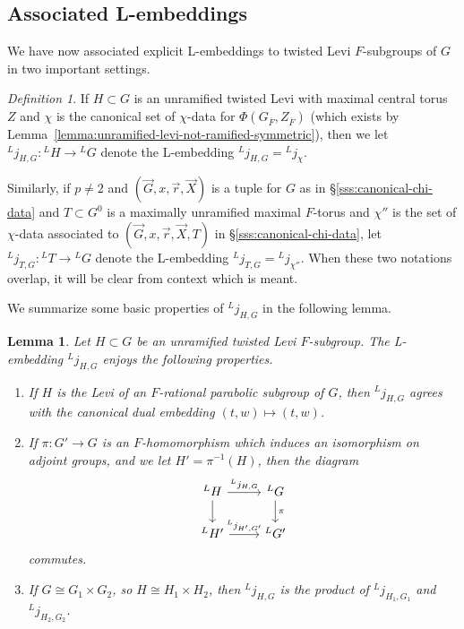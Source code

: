 \documentclass[reqno]{amsart}
\numberwithin{equation}{subsection}
\newcommand{\ol}[1]{\overline{#1}}
\newcommand{\co}{\colon}
\newcommand{\ld}{{}^L}
\newtheorem{lemma}[thm]{Lemma}
\theoremstyle{remark}
\newtheorem{defn}[thm]{Definition}
\numberwithin{equation}{subsection}
\numberwithin{figure}{subsection}
\begin{document}
\subsection{Associated L-embeddings} We have now associated explicit L-embeddings to twisted Levi $F$-subgroups of $G$ in two important settings.

\begin{defn}\label{defn:canonical-l-embeddings} If $H \subset G$ is an unramified twisted Levi with maximal central torus $Z$ and $\chi$ is the canonical set of $\chi$-data for $\Phi(G_{\ol F}, Z_{\ol F})$ (which exists by Lemma~\ref{lemma:unramified-levi-not-ramified-symmetric}), then we let $\ld j_{H,G}\co \ld H \to \ld G$ denote the L-embedding $\ld j_{H,G} = \ld j_\chi$.

Similarly, if $p \neq 2$ and $(\vec{G},x,\vec{r},\vec{X})$ is a tuple for $G$ as in \S\ref{sss:canonical-chi-data} and $T \subset G^0$ is a maximally unramified maximal $F$-torus and $\chi''$ is the set of $\chi$-data associated to $(\vec{G},x,\vec{r},\vec{X},T)$ in \S\ref{sss:canonical-chi-data}, let $\ld j_{T, G}\co \ld T \to \ld G$ denote the L-embedding $\ld j_{T, G} = \ld j_{\chi''}$. When these two notations overlap, it will be clear from context which is meant.
\end{defn}

We summarize some basic properties of $\ld j_{H,G}$ in the following lemma.

\begin{lemma}\label{lem:unramified-L-embedding-properties}
Let $H \subset G$ be an unramified twisted Levi $F$-subgroup. The L-embedding $\ld j_{H,G}$ enjoys the following properties.
\begin{enumerate}
\item If $H$ is the Levi of an $F$-rational parabolic subgroup of $G$, then $\ld j_{H, G}$ agrees with the canonical dual embedding $(t, w) \mapsto (t, w)$.
\item If $\pi\co G' \to G$ is an $F$-homomorphism which induces an isomorphism on adjoint groups, and we let $H' = \pi^{-1}(H)$, then the diagram
\[
\begin{tikzcd}
    \ld H \arrow[r, "{\ld j_{H,G}}"] \arrow[d]
        &\ld G \arrow[d, "\pi"] \\
    \ld H' \arrow[r, "{\ld j_{H',G'}}"]
        &\ld G'
\end{tikzcd}
\]
commutes.
\item If $G \cong G_1 \times G_2$, so $H \cong H_1 \times H_2$, then $\ld j_{H,G}$ is the product of $\ld j_{H_1, G_1}$ and $\ld j_{H_2, G_2}$.
\end{enumerate}
\end{lemma}
\end{document}
